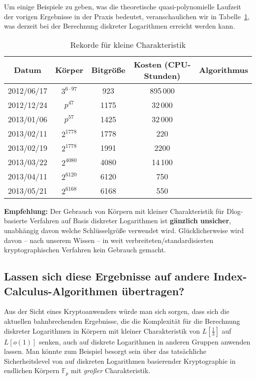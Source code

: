 \begin{refsegment}
Um einige Beispiele zu geben, was die theoretische quasi-polynomielle Laufzeit der vorigen Ergebnisse in der Praxis bedeutet, veranschaulichen wir in Tabelle~\ref{dlog-table}, was derzeit bei der Berechnung diskreter Logarithmen erreicht werden kann.

\begin{table}[h]
\begin{center}
\begin{tabular}{ccccc}
Datum & Körper & Bitgröße & Kosten (CPU-Stunden) & Algorithmus\\
\hline
 2012/06/17&$3^{6\cdot 97}$ & 923 & 895\,000 & \cite{JL2006}\\
2012/12/24&$p^{47}$ & 1175 & 32\,000 & \cite{Pin2013}\\
2013/01/06&$p^{57}$ & 1425 & 32\,000 & \cite{Pin2013}\\
2013/02/11 &$2^{1778}$ & 1778 & 220 & \cite{Joux2013}\\
2013/02/19 &$2^{1778}$ & 1991 & 2200 & \cite{GGMZ2013}\\
2013/03/22 &$2^{4080}$& 4080 & 14\,100 & \cite{Joux2013}\\
2013/04/11&$2^{6120}$ & 6120 & 750 & \cite{Joux2013}\\
2013/05/21&$2^{6168}$ & 6168 & 550 & \cite{Joux2013}\\
\hline
\end{tabular}
\caption{Rekorde für kleine Charakteristik}
\label{dlog-table}
\end{center}
\end{table}

\textbf{Empfehlung:}
Der Gebrauch von Körpern mit kleiner Charakteristik für Dlog-basierte Verfahren auf Basis diskreter Logarithmen ist \textbf{gänzlich unsicher}, unabhängig davon welche Schlüsselgröße verwendet wird. Glücklicherweise wird davon -- nach unserem Wissen -- in weit verbreiteten/standardisierten kryptographischen Verfahren kein Gebrauch gemacht.



\subsection{Lassen sich diese Ergebnisse auf andere
Index-Calculus-Algo\-rithmen übertragen?}

Aus der Sicht eines Kryptoanwenders würde man sich sorgen, dass sich die aktuellen bahnbrechenden Ergebnisse, die die Komplexität für die Berechnung diskreter Logarithmen in Körpern mit kleiner Charakteristik von $L[\frac 1 3]$ auf $L[o(1)]$ senken, auch auf diskrete Logarithmen in anderen Gruppen anwenden lassen. Man könnte zum Beispiel besorgt sein über das tatsächliche Sicherheitslevel von auf diskreten Logarithmen basierender Kryptographie in endlichen Körpern $\mathbb{F}_p$ mit {\em großer} Charakteristik.\\[0.1cm]


\end{refsegment}
